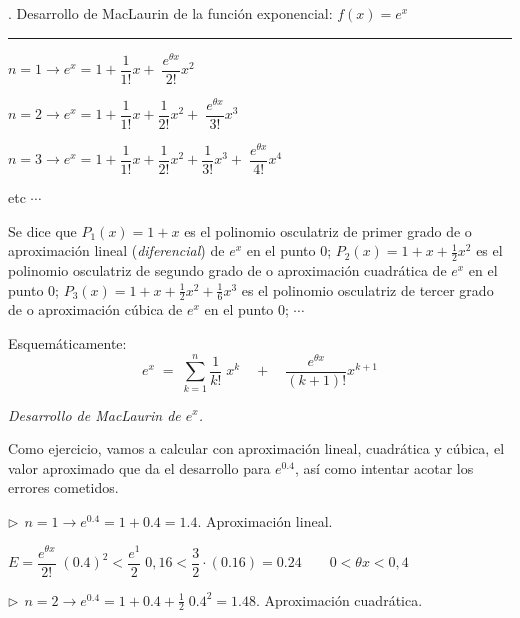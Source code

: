 	\begin{miejercicio} 
	.  Desarrollo de MacLaurin de la función exponencial: $f(x)=e^x$
	
	\rule{200pt}{0.1pt}
	
	\vspace{2mm}
	
	$n=1 \to e^x=1+	\dfrac {1}{1!}x+ \boxed{\; \dfrac {e^{\theta x}}{2!}x^2}\; $
	
	$n=2 \to e^x=1+	\dfrac {1}{1!}x+ \dfrac {1}{2!}x^2+ \boxed{\; \dfrac {e^{\theta x}}{3!}x^3}\; $
	
	$n=3 \to e^x=1+	\dfrac {1}{1!}x+ \dfrac {1}{2!}x^2+ \dfrac {1}{3!}x^3+\boxed{\; \dfrac {e^{\theta x}}{4!}x^4}\; $
	
	etc $\cdots$
	
	Se dice que $P_1(x)=1+x$ es el polinomio osculatriz de primer grado de o aproximación lineal (\textit{diferencial}) de $e^x$ en el punto $0$; $P_2(x)=1+x+\frac 1 2 x^2$ es el polinomio osculatriz de segundo grado de o aproximación cuadrática  de $e^x$ en el punto $0$; $P_3(x)=1+x+\frac 1 2 x^2+ \frac 1 6 x^3$ es el polinomio osculatriz de tercer grado de o aproximación cúbica  de $e^x$ en el punto $0$;	$\cdots$
	
	Esquemáticamente:  
	\begin{equation*}\label{MacLaurin-exp}
		\boxed{\quad { e }^{ x }\; =\; \sum _{ k=1 }^{ n }{ \dfrac { 1 }{ k! } \; { x }^{ k } } 	\quad +\quad \dfrac { { e }^{ \theta x } }{ (k+1)! } { x }^{ k+1 } \quad}  
	\end{equation*}
	\centerline{\emph{Desarrollo de MacLaurin de $e^x$.}}
	
	\vspace{5mm} Como ejercicio, vamos a calcular con aproximación lineal, cuadrática y cúbica, el valor aproximado que da el desarrollo para $e^{0.4}$, así como intentar acotar los errores cometidos.
	
	\vspace{2mm}
	
	\begin{multicols}{2}
	$\triangleright \ \   n=1 \to e^{0.4}=1+0.4=1.4 $. Aproximación lineal.
	
	$E=\dfrac {e^{\theta x}}{2!}\; (0.4)^2 < \dfrac {e^1}{2}\; 0,16 < \dfrac {3}{2} \cdot (0.16)=0.24 \qquad 0<\theta x< 0,4$
	
	\vspace{2mm}
	
	$\triangleright \ \ n=2 \to e^{0.4}=1+0.4+\frac 1 2\;  0.4^2=1.48 $. Aproximación cuadrática.
	

\end{multicols}
\end{miejercicio}
